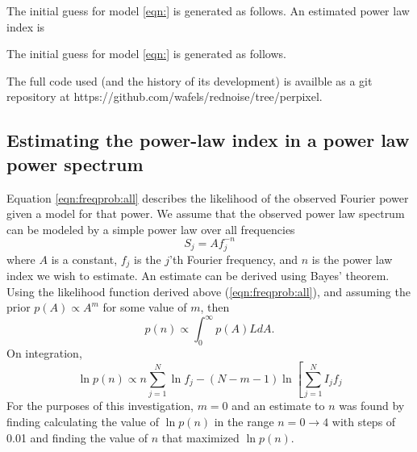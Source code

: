 \documentclass[onecolumn]{emulateapj}
\begin{document}
The initial guess for model \ref{eqn:} is generated as follows.  An
estimated power law index is 

The initial guess for model \ref{eqn:} is generated as follows.


The full code used (and the history of its development) is availble as
a git repository at https://github.com/wafels/rednoise/tree/perpixel.

\subsection{Estimating the power-law index in a power law power
  spectrum}
Equation \ref{eqn:freqprob:all} describes the likelihood of the
observed Fourier power given a model for that power.  We assume that
the observed power law spectrum can be modeled by a simple power law
over all frequencies
\begin{equation}
S_{j} = Af_{j}^{-n}
\end{equation}
where $A$ is a constant, $f_{j}$ is the $j$'th Fourier frequency, and
$n$ is the power law index we wish to estimate.  An estimate can be
derived using Bayes' theorem. Using the likelihood function derived
above (\ref{eqn:freqprob:all}), and assuming the prior $p(A)\propto
A^{m}$ for some value of $m$, then 
\begin{equation}
p(n) \propto \int_{0}^{\infty} p(A) L dA.
\label{eqn:bayes}
\end{equation}
On integration,
\begin{equation}
\ln p(n) \propto n\sum_{j=1}^{N}\ln f_{j} - (N-m-1)\ln\left[\sum_{j=1}^{N}I_{j}f_{j}
\label{eqn:pnlog}
\end{equation}
For the purposes of this investigation, $m=0$ and an estimate to $n$
was found by finding calculating the value of $\ln p(n)$ in the range
$n=0\rightarrow4$ with steps of 0.01 and finding the value of $n$ that
maximized $\ln p(n)$.


\end{document}
